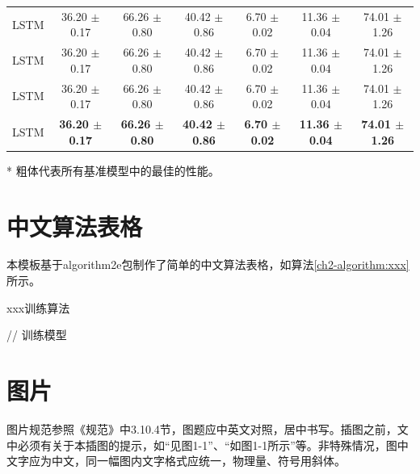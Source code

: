 \begin{table}
\begin{threeparttable}
\begin{tabular}{c|ccc|ccc}
			LSTM & 36.20 $\pm$0.17 & 66.26 $\pm$0.80 & 40.42 $\pm$0.86 & 6.70 $\pm$0.02 & 11.36 $\pm$0.04 & 74.01 $\pm$1.26  \\
			LSTM & 36.20 $\pm$0.17 & 66.26 $\pm$0.80 & 40.42 $\pm$0.86 & 6.70 $\pm$0.02 & 11.36 $\pm$0.04 & 74.01 $\pm$1.26  \\
			LSTM & 36.20 $\pm$0.17 & 66.26 $\pm$0.80 & 40.42 $\pm$0.86 & 6.70 $\pm$0.02 & 11.36 $\pm$0.04 & 74.01 $\pm$1.26  \\
			LSTM & \textbf{36.20 $\pm$0.17} & \textbf{66.26 $\pm$0.80} & \textbf{40.42 $\pm$0.86} & \textbf{6.70 $\pm$0.02} & \textbf{11.36 $\pm$0.04} & \textbf{74.01 $\pm$1.26}  \\
			\bottomrule
		\end{tabular}
		\begin{tablenotes}
			\footnotesize
			\item[*] 粗体代表所有基准模型中的最佳的性能。
		\end{tablenotes}
	\end{threeparttable}
	\label{tab:ch2_res3}
\end{table}


\section{中文算法表格}
本模板基于algorithm2e包制作了简单的中文算法表格，如算法\ref{ch2-algorithm:xxx}所示。

\begin{algorithm}[!htb]
	\renewcommand{\thealgocf}{1.1} %
	\LinesNumbered
	\caption{xxx训练算法}
	\label{ch2-algorithm:xxx}
	
	// 训练模型\;
\end{algorithm}




%
\section{图片}

图片规范参照《规范》中3.10.4节，图题应中英文对照，居中书写。插图之前，文中必须有关于本插图的提示，如“见图1-1”、“如图1-1所示”等。非特殊情况，图中文字应为中文，同一幅图内文字格式应统一，物理量、符号用斜体。


